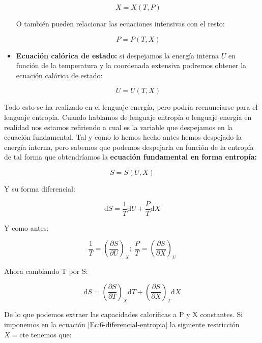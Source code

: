 \documentclass[12pt,a4paper]{article}
\newcommand{\D}{\mathrm{d}}
\newcommand{\parentesis}[1]{\left( #1 \right)}
\newcommand{\parciales}[2]{\frac{\partial #1}{\partial #2}}
\begin{document}
\begin{itemize}
\begin{equation}
X = X(T, P)
\end{equation}

O también pueden relacionar las ecuaciones intensivas con el resto: 

\begin{equation}
P = P(T, X)
\end{equation}

\item \textbf{Ecuación calórica de estado:} si despejamos la energía interna $U$ en función de la temperatura y la coordenada extensiva podremos obtener la ecuación calórica de estado:

\begin{equation}
U = U(T,X)
\end{equation}

\end{itemize}

Todo esto se ha realizado en el lenguaje energía, pero podría reenunciarse para el lenguaje entropía. Cuando hablamos de lenguaje entropía o lenguaje energía en realidad nos estamos refiriendo a cual es la variable que despejamos en la ecuación fundamental. Tal y como lo hemos hecho antes hemos despejado la energía interna, pero sabemos que podemos despejarla en función de la entropía de tal forma que obtendríamos la \textbf{ecuación fundamental en forma entropía:}

\begin{equation}
S = S(U, X)
\end{equation}

Y su forma diferencial:

\begin{equation}
\D S = \dfrac{1}{T} \D U + \dfrac{P}{T} \D X \label{Ec:6-diferencial-entropia}
\end{equation}

Y como antes:

\begin{equation}
\dfrac{1}{T} = \parentesis{\parciales{S}{U}}_X; \ \dfrac{P}{T} = \parentesis{\parciales{S}{X}}_U
\end{equation}

Ahora cambiando T por S:

\begin{equation}
\D S = \parentesis{\parciales{S}{T}}_X \D T + \parentesis{\parciales{S}{X}}_T \D X
\end{equation}

De lo que podemos extraer las capacidades caloríficas a P y X constantes. Si imponemos en la ecuación \ref{Ec:6-diferencial-entropia} la siguiente restricción $X = \text{cte}$ tenemos que:
\end{document}
